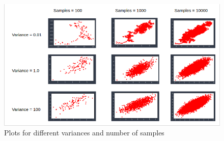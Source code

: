 \documentclass{article}
\begin{document}
\begin{figure}[h!]
\begin{center}
\includegraphics[scale=0.65]{plots_mh.png}
\caption{Plots for different variances and number of samples}
\label{mh}
\end{center}
\end{figure}
\end{document}
